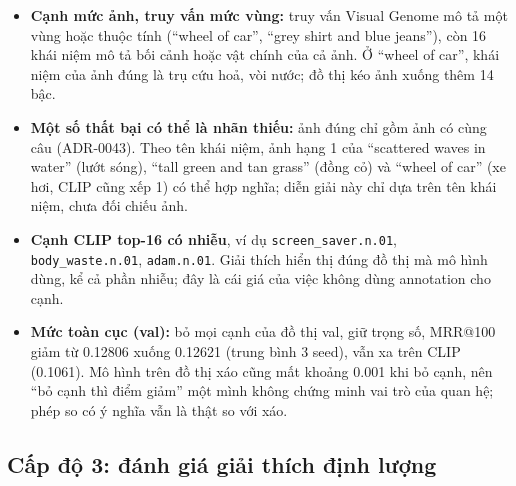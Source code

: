 \documentclass[12pt, a4paper]{article}
\makeatletter
\newcommand{\code}[1]{\texttt{#1}}
\newcommand{\mrr}{MRR@100}
\makeatother
\begin{document}
\begin{itemize}
\item \textbf{Cạnh mức ảnh, truy vấn mức vùng:} truy vấn Visual Genome mô tả một vùng hoặc thuộc tính (``wheel of car'', ``grey shirt and blue jeans''), còn 16 khái niệm mô tả bối cảnh hoặc vật chính của cả ảnh. Ở ``wheel of car'', khái niệm của ảnh đúng là trụ cứu hoả, vòi nước; đồ thị kéo ảnh xuống thêm 14 bậc.
\item \textbf{Một số thất bại có thể là nhãn thiếu:} ảnh đúng chỉ gồm ảnh có cùng câu (ADR-0043). Theo tên khái niệm, ảnh hạng 1 của ``scattered waves in water'' (lướt sóng), ``tall green and tan grass'' (đồng cỏ) và ``wheel of car'' (xe hơi, CLIP cũng xếp 1) có thể hợp nghĩa; diễn giải này chỉ dựa trên tên khái niệm, chưa đối chiếu ảnh.
\item \textbf{Cạnh CLIP top-16 có nhiễu}, ví dụ \code{screen\_saver.n.01}, \code{body\_waste.n.01}, \code{adam.n.01}. Giải thích hiển thị đúng đồ thị mà mô hình dùng, kể cả phần nhiễu; đây là cái giá của việc không dùng annotation cho cạnh.
\item \textbf{Mức toàn cục (val):} bỏ mọi cạnh của đồ thị val, giữ trọng số, \mrr{} giảm từ 0.12806 xuống 0.12621 (trung bình 3 seed), vẫn xa trên CLIP (0.1061). Mô hình trên đồ thị xáo cũng mất khoảng 0.001 khi bỏ cạnh, nên ``bỏ cạnh thì điểm giảm'' một mình không chứng minh vai trò của quan hệ; phép so có ý nghĩa vẫn là thật so với xáo.
\end{itemize}

\subsection{Cấp độ 3: đánh giá giải thích định lượng}
\end{document}
